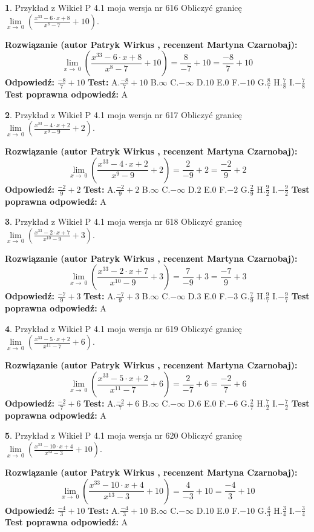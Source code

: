 \documentclass[12pt, a4paper]{article}
\theoremstyle{definition} %
\newtheorem{zad}{}
\newcommand{\zadStart}[1]{\begin{zad}#1\newline}
\newcommand{\zadStop}{\end{zad}}
\newcommand{\rozwStart}[2]{\noindent \textbf{Rozwiązanie (autor #1 , recenzent #2): }\newline}
\newcommand{\rozwStop}{\newline}
\newcommand{\odpStart}{\noindent \textbf{Odpowiedź:}\newline}
\newcommand{\odpStop}{\newline}
\newcommand{\testStart}{\noindent \textbf{Test:}\newline}
\newcommand{\testStop}{\newline}
\newcommand{\kluczStart}{\noindent \textbf{Test poprawna odpowiedź:}\newline}
\newcommand{\kluczStop}{\newline}
\begin{document}
\zadStart{Przykład z Wikieł P 4.1 moja wersja nr 616}
Obliczyć granicę $\lim\limits_{x\to\ 0}(\frac{x^{33}-6 \cdot x +8}{x^{8}-7}+10)$.
\zadStop
\rozwStart{Patryk Wirkus}{Martyna Czarnobaj}
$$\lim\limits_{x\to\ 0}(\frac{x^{33}-6 \cdot x +8}{x^{8}-7}+10)=\frac{8}{-7}+10=\frac{-8}{7}+10$$
\rozwStop
\odpStart
$\frac{-8}{7}+10$
\odpStop
\testStart
A.$\frac{-8}{7}+10$
B.$\infty$
C.$-\infty$
D.$10$
E.$0$
F.$-10$
G.$\frac{8}{7}$
H.$\frac{7}{8}$
I.$-\frac{7}{8}$
\testStop
\kluczStart
A
\kluczStop



\zadStart{Przykład z Wikieł P 4.1 moja wersja nr 617}
Obliczyć granicę $\lim\limits_{x\to\ 0}(\frac{x^{33}-4 \cdot x +2}{x^{9}-9}+2)$.
\zadStop
\rozwStart{Patryk Wirkus}{Martyna Czarnobaj}
$$\lim\limits_{x\to\ 0}(\frac{x^{33}-4 \cdot x +2}{x^{9}-9}+2)=\frac{2}{-9}+2=\frac{-2}{9}+2$$
\rozwStop
\odpStart
$\frac{-2}{9}+2$
\odpStop
\testStart
A.$\frac{-2}{9}+2$
B.$\infty$
C.$-\infty$
D.$2$
E.$0$
F.$-2$
G.$\frac{2}{9}$
H.$\frac{9}{2}$
I.$-\frac{9}{2}$
\testStop
\kluczStart
A
\kluczStop



\zadStart{Przykład z Wikieł P 4.1 moja wersja nr 618}
Obliczyć granicę $\lim\limits_{x\to\ 0}(\frac{x^{33}-2 \cdot x +7}{x^{10}-9}+3)$.
\zadStop
\rozwStart{Patryk Wirkus}{Martyna Czarnobaj}
$$\lim\limits_{x\to\ 0}(\frac{x^{33}-2 \cdot x +7}{x^{10}-9}+3)=\frac{7}{-9}+3=\frac{-7}{9}+3$$
\rozwStop
\odpStart
$\frac{-7}{9}+3$
\odpStop
\testStart
A.$\frac{-7}{9}+3$
B.$\infty$
C.$-\infty$
D.$3$
E.$0$
F.$-3$
G.$\frac{7}{9}$
H.$\frac{9}{7}$
I.$-\frac{9}{7}$
\testStop
\kluczStart
A
\kluczStop



\zadStart{Przykład z Wikieł P 4.1 moja wersja nr 619}
Obliczyć granicę $\lim\limits_{x\to\ 0}(\frac{x^{33}-5 \cdot x +2}{x^{11}-7}+6)$.
\zadStop
\rozwStart{Patryk Wirkus}{Martyna Czarnobaj}
$$\lim\limits_{x\to\ 0}(\frac{x^{33}-5 \cdot x +2}{x^{11}-7}+6)=\frac{2}{-7}+6=\frac{-2}{7}+6$$
\rozwStop
\odpStart
$\frac{-2}{7}+6$
\odpStop
\testStart
A.$\frac{-2}{7}+6$
B.$\infty$
C.$-\infty$
D.$6$
E.$0$
F.$-6$
G.$\frac{2}{7}$
H.$\frac{7}{2}$
I.$-\frac{7}{2}$
\testStop
\kluczStart
A
\kluczStop



\zadStart{Przykład z Wikieł P 4.1 moja wersja nr 620}
Obliczyć granicę $\lim\limits_{x\to\ 0}(\frac{x^{33}-10 \cdot x +4}{x^{13}-3}+10)$.
\zadStop
\rozwStart{Patryk Wirkus}{Martyna Czarnobaj}
$$\lim\limits_{x\to\ 0}(\frac{x^{33}-10 \cdot x +4}{x^{13}-3}+10)=\frac{4}{-3}+10=\frac{-4}{3}+10$$
\rozwStop
\odpStart
$\frac{-4}{3}+10$
\odpStop
\testStart
A.$\frac{-4}{3}+10$
B.$\infty$
C.$-\infty$
D.$10$
E.$0$
F.$-10$
G.$\frac{4}{3}$
H.$\frac{3}{4}$
I.$-\frac{3}{4}$
\testStop
\kluczStart
A
\kluczStop
\end{document}
